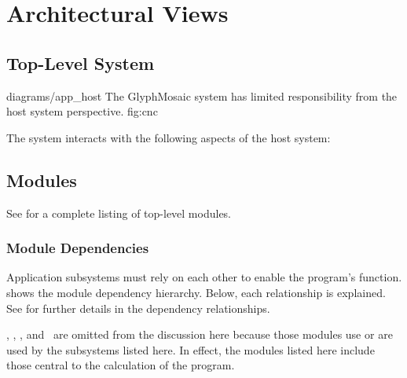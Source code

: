 \section{Architectural Views}
\label{sec:views}
\subsection{Top-Level System}
\sidiagram
{diagrams/app_host}
{The GlyphMosaic system has limited responsibility from the host system perspective.}
{fig:cnc}
{\diagsize}

The system interacts with the following aspects of the host system:
\begin{itemize}
\end{itemize}


\subsection{Modules}
\label{sec:modules}
See  for a complete listing of top-level modules.


\subsubsection{Module Dependencies}
Application subsystems must rely on each other to enable the program's function.
 shows the module dependency hierarchy.
Below, each relationship is explained.
See  for further details in the dependency relationships.

\docmod, \uimod, \permod, and \bmmod\ are omitted from the discussion here because those modules use or are used by the subsystems listed here.
In effect, the modules listed here include those central to the calculation of the program.

